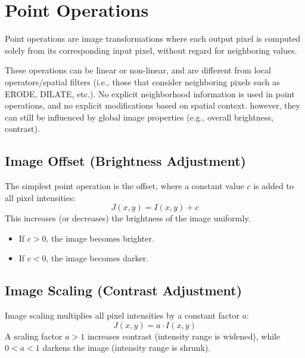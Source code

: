 \section{Point Operations}

Point operations are image transformations where each output pixel is computed solely from its corresponding input pixel, without regard for neighboring values.


These operations can be linear or non-linear, and are different from local operators/spatial filters (i.e., those that consider neighboring pixels such as ERODE, DILATE, etc.). No explicit neighborhood information is used in point operations, and no explicit modifications based on spatial context. however, they can still be influenced by global image properties (e.g., overall brightness, contrast).

\subsection{Image Offset (Brightness Adjustment)}
The simplest point operation is the offset, where a constant value $c$ is added to all pixel intensities:
$$
J(x, y) = I(x, y) + c
$$
This increases (or decreases) the brightness of the image uniformly.
\begin{itemize}
    \item If $c > 0$, the image becomes brighter.
    \item If $c < 0$, the image becomes darker.
\end{itemize}


\subsection{Image Scaling (Contrast Adjustment)}
Image scaling multiplies all pixel intensities by a constant factor $a$:
$$
J(x, y) = a \cdot I(x, y)
$$
A scaling factor $a > 1$ increases contrast (intensity range is widened), while $0 < a < 1$ darkens the image (intensity range is shrunk).


